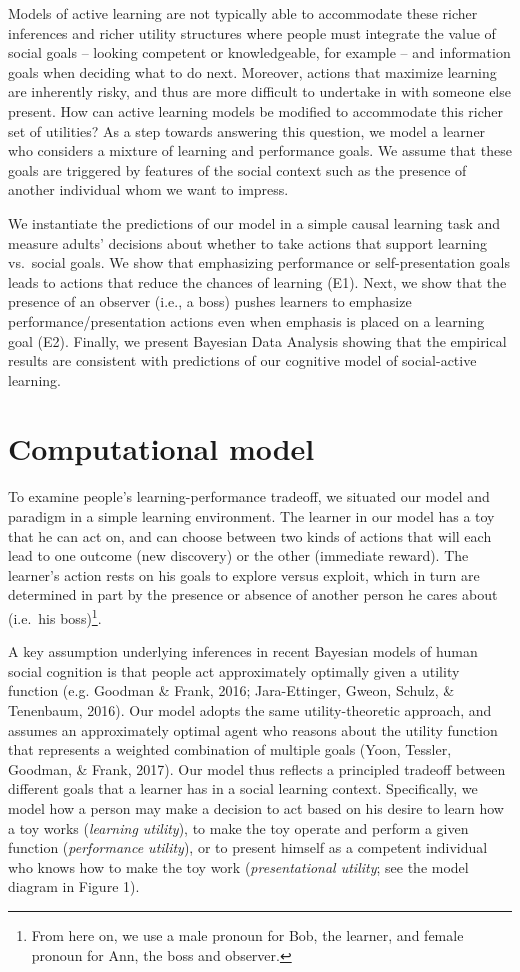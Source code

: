\documentclass[10pt, letterpaper]{article}
\begin{document}
Models of active learning are not typically able to accommodate these
richer inferences and richer utility structures where people must
integrate the value of social goals -- looking competent or
knowledgeable, for example -- and information goals when deciding what
to do next. Moreover, actions that maximize learning are inherently
risky, and thus are more difficult to undertake in with someone else
present. How can active learning models be modified to accommodate this
richer set of utilities? As a step towards answering this question, we
model a learner who considers a mixture of learning and performance
goals. We assume that these goals are triggered by features of the
social context such as the presence of another individual whom we want
to impress.

We instantiate the predictions of our model in a simple causal learning
task and measure adults' decisions about whether to take actions that
support learning vs.~social goals. We show that emphasizing performance
or self-presentation goals leads to actions that reduce the chances of
learning (E1). Next, we show that the presence of an observer (i.e., a
boss) pushes learners to emphasize performance/presentation actions even
when emphasis is placed on a learning goal (E2). Finally, we present
Bayesian Data Analysis showing that the empirical results are consistent
with predictions of our cognitive model of social-active learning.

\section{Computational model}\label{computational-model}

To examine people's learning-performance tradeoff, we situated our model
and paradigm in a simple learning environment. The learner in our model
has a toy that he can act on, and can choose between two kinds of
actions that will each lead to one outcome (new discovery) or the other
(immediate reward). The learner's action rests on his goals to explore
versus exploit, which in turn are determined in part by the presence or
absence of another person he cares about (i.e.~his
boss)\footnote{From here on, we use a male pronoun for Bob, the learner, and female pronoun for Ann, the boss and observer.}.

A key assumption underlying inferences in recent Bayesian models of
human social cognition is that people act approximately optimally given
a utility function (e.g. Goodman \& Frank, 2016; Jara-Ettinger, Gweon,
Schulz, \& Tenenbaum, 2016). Our model adopts the same utility-theoretic
approach, and assumes an approximately optimal agent who reasons about
the utility function that represents a weighted combination of multiple
goals (Yoon, Tessler, Goodman, \& Frank, 2017). Our model thus reflects
a principled tradeoff between different goals that a learner has in a
social learning context. Specifically, we model how a person may make a
decision to act based on his desire to learn how a toy works
(\emph{learning utility}), to make the toy operate and perform a given
function (\emph{performance utility}), or to present himself as a
competent individual who knows how to make the toy work
(\emph{presentational utility}; see the model diagram in Figure 1).
\end{document}
